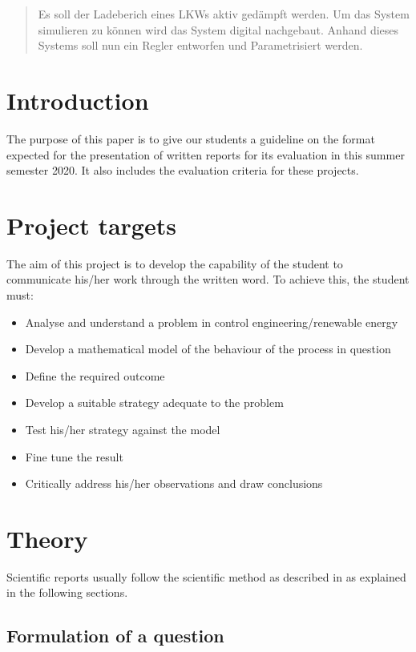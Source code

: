 	\begin{abstract} %
		Es soll der Ladeberich eines LKWs aktiv gedämpft werden. Um das System simulieren zu können wird das System digital nachgebaut. Anhand dieses Systems soll nun ein Regler entworfen und Parametrisiert werden.
	\end{abstract}
	
	\section{Introduction}
	
	The purpose of this paper is to give our students a guideline on the format expected for the presentation of written reports for its evaluation in this summer semester 2020. It also includes the evaluation criteria for these projects.
	
	\section{Project targets}
	
	The aim of this project is to develop the capability of the student to communicate his/her work through the written word. To achieve this, the student must:
	
	\begin{itemize}
		\item Analyse and understand a problem in control engineering/renewable energy
		\item Develop a mathematical model of the behaviour of the process in question
		\item Define the required outcome
		\item Develop a suitable strategy adequate to the problem
		\item Test his/her strategy against the model
		\item Fine tune the result
		\item Critically address his/her observations and draw conclusions
	\end{itemize}
	
	\section{Theory}
	
	Scientific reports usually follow the scientific method as described in \cite{scientificMethod} as explained in the following sections.
	
	\subsection{Formulation of a question}
	
